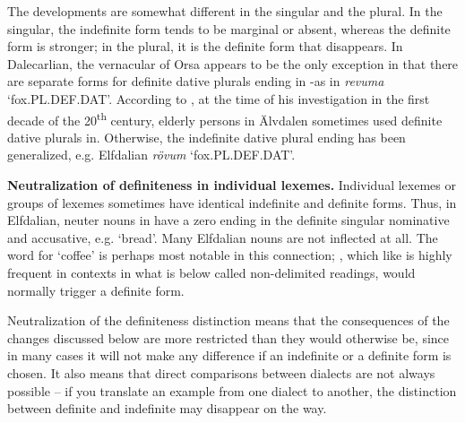 The developments are somewhat different in the singular and the plural. In the singular, the indefinite form tends to be marginal or absent, whereas the definite form is stronger; in the plural, it is the definite form that disappears. In Dalecarlian,  the vernacular of Orsa appears to be the only exception in that there are separate forms for definite dative plurals ending in \nobreakdash-as in \textit{revuma} ‘fox.PL.DEF.DAT’. According to \citet{Levander1909}, at the time of his investigation in the first decade of the 20\textsuperscript{th} century, elderly persons in Älvdalen sometimes used definite dative plurals in\textstyleLinguisticExample{ }.  Otherwise, the indefinite dative plural ending  has been generalized, e.g. Elfdalian \textit{rövum} ‘fox.PL.DEF.DAT’.

\textbf{Neutralization of definiteness in individual lexemes. }Individual lexemes or groups of lexemes sometimes have identical indefinite and definite forms. Thus, in Elfdalian, neuter nouns in have a zero ending in the definite singular nominative and accusative, e.g.  ‘bread’. Many Elfdalian nouns are not inflected at all.  The word for ‘coffee’ is perhaps most notable in this connection; , which like  is highly frequent in contexts in what is below called non-delimited readings, would normally trigger a definite form. 

Neutralization of the definiteness distinction means that the consequences of the changes discussed below are more restricted than they would otherwise be, since in many cases it will not make any difference if an indefinite or a definite form is chosen. It also means that direct comparisons between dialects are not always possible – if you translate an example from one dialect to another, the distinction between definite and indefinite may disappear on the way. 

